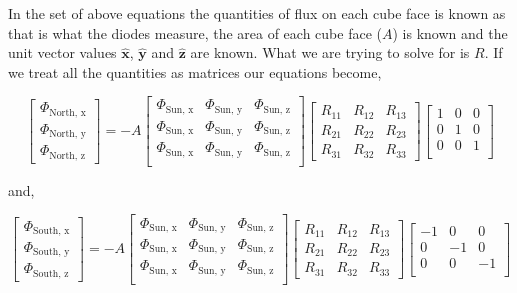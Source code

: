 \documentclass[10pt, letterpaper]{article}
\begin{document}
In the set of above equations the quantities of flux on each cube face is known as that is what the diodes measure, the area of each cube face ($A$) is known and the unit vector values $\mathbf{\hat{x}}$, $\mathbf{\hat{y}}$ and $\mathbf{\hat{z}}$ are known. What we are trying to solve for is $R$. If we treat all the quantities as matrices our equations become,

\[
\begin{bmatrix}
\Phi_{\text{North, x}} \\
\Phi_{\text{North, y}} \\
\Phi_{\text{North, z}}
\end{bmatrix}
= -A
\begin{bmatrix}
\Phi_{\text{Sun, x}} & \Phi_{\text{Sun, y}} & \Phi_{\text{Sun, z}} \\
\Phi_{\text{Sun, x}} & \Phi_{\text{Sun, y}} & \Phi_{\text{Sun, z}} \\
\Phi_{\text{Sun, x}} & \Phi_{\text{Sun, y}} & \Phi_{\text{Sun, z}} \\
\end{bmatrix}
\begin{bmatrix}
R_{11} & R_{12} & R_{13} \\
R_{21} & R_{22} & R_{23} \\
R_{31} & R_{32} & R_{33}
\end{bmatrix}
\begin{bmatrix}
1 & 0 & 0 \\
0 & 1 & 0 \\
0 & 0 & 1 \\
\end{bmatrix}
\]

and,

\[
\begin{bmatrix}
\Phi_{\text{South, x}} \\
\Phi_{\text{South, y}} \\
\Phi_{\text{South, z}}
\end{bmatrix}
= -A
\begin{bmatrix}
\Phi_{\text{Sun, x}} & \Phi_{\text{Sun, y}} & \Phi_{\text{Sun, z}} \\
\Phi_{\text{Sun, x}} & \Phi_{\text{Sun, y}} & \Phi_{\text{Sun, z}} \\
\Phi_{\text{Sun, x}} & \Phi_{\text{Sun, y}} & \Phi_{\text{Sun, z}} \\
\end{bmatrix}
\begin{bmatrix}
R_{11} & R_{12} & R_{13} \\
R_{21} & R_{22} & R_{23} \\
R_{31} & R_{32} & R_{33}
\end{bmatrix}
\begin{bmatrix}
-1 & 0 & 0 \\
0 & -1 & 0 \\
0 & 0 & -1 \\
\end{bmatrix}
\]
\end{document}
